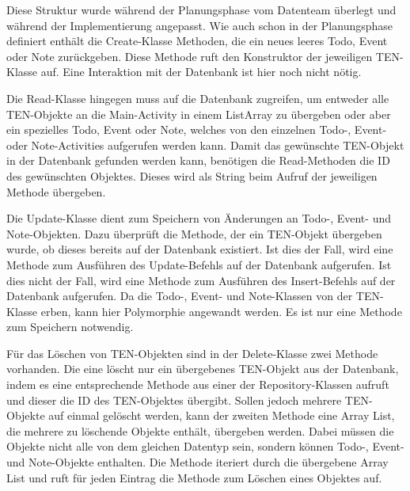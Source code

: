 Diese Struktur wurde während der Planungsphase vom Datenteam überlegt und während der Implementierung angepasst. Wie auch schon in der Planungsphase definiert enthält die Create-Klasse Methoden, die ein neues leeres Todo, Event oder Note zurückgeben. Diese Methode ruft den Konstruktor der jeweiligen TEN-Klasse auf. Eine Interaktion mit der Datenbank ist hier noch nicht nötig.

Die Read-Klasse hingegen muss auf die Datenbank zugreifen, um entweder alle TEN-Objekte an die Main-Activity in einem ListArray zu übergeben oder aber ein spezielles Todo, Event oder Note, welches von den einzelnen Todo-, Event- oder Note-Activities aufgerufen werden kann. Damit das gewünschte TEN-Objekt in der Datenbank gefunden werden kann, benötigen die Read-Methoden die ID des gewünschten Objektes. Dieses wird als String beim Aufruf der jeweiligen Methode übergeben.

Die Update-Klasse dient zum Speichern von Änderungen an Todo-, Event- und Note-Objekten. Dazu überprüft die Methode, der ein TEN-Objekt übergeben wurde, ob dieses bereits auf der Datenbank existiert. Ist dies der Fall, wird eine Methode zum Ausführen des Update-Befehls auf der Datenbank aufgerufen. Ist dies nicht der Fall, wird eine Methode zum Ausführen des Insert-Befehls auf der Datenbank aufgerufen. Da die Todo-, Event- und Note-Klassen von der TEN-Klasse erben, kann hier Polymorphie angewandt werden. Es ist nur eine Methode zum Speichern notwendig.

Für das Löschen von TEN-Objekten sind in der Delete-Klasse zwei Methode vorhanden. Die eine löscht nur ein übergebenes TEN-Objekt aus der Datenbank, indem es eine entsprechende Methode aus einer der Repository-Klassen aufruft und dieser die ID des TEN-Objektes übergibt. Sollen jedoch mehrere TEN-Objekte auf einmal gelöscht werden, kann der zweiten Methode eine Array List, die mehrere zu löschende Objekte enthält, übergeben werden. Dabei müssen die Objekte nicht alle von dem gleichen Datentyp sein, sondern können Todo-, Event- und Note-Objekte enthalten. Die Methode iteriert durch die übergebene Array List und ruft für jeden Eintrag die Methode zum Löschen eines Objektes auf.


